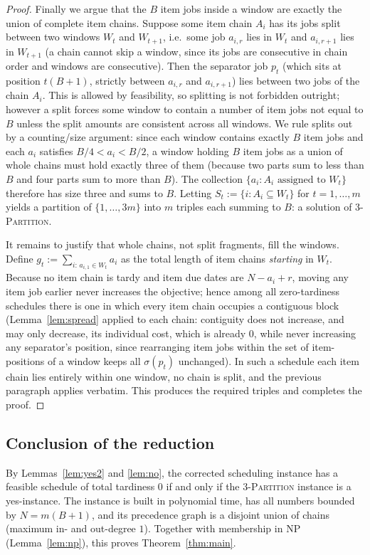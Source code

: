 \documentclass{amsart}
\theoremstyle{definition}
\theoremstyle{remark}
\begin{document}
\begin{proof}
Finally we argue that the $B$ item jobs inside a window are exactly the union of complete
item chains. Suppose some item chain $A_i$ has its jobs split between two windows
$W_t$ and $W_{t+1}$, i.e.\ some job $a_{i,r}$ lies in $W_t$ and $a_{i,r+1}$ lies in
$W_{t+1}$ (a chain cannot skip a window, since its jobs are consecutive in chain order and
windows are consecutive). Then the separator job $p_t$ (which sits at position $t(B+1)$,
strictly between $a_{i,r}$ and $a_{i,r+1}$) lies between two jobs of the chain $A_i$. This
is allowed by feasibility, so splitting is not forbidden outright; however a split forces
some window to contain a number of item jobs not equal to $B$ unless the split amounts are
consistent across all windows. We rule splits out by a counting/size argument: since each
window contains exactly $B$ item jobs and each $a_i$ satisfies $B/4<a_i<B/2$, a window
holding $B$ item jobs as a union of whole chains must hold exactly three of them
(because two parts sum to less than $B$ and four parts sum to more than $B$). The
collection $\{a_i : A_i \text{ assigned to } W_t\}$ therefore has size three and sums to
$B$. Letting $S_t:=\{i:A_i\subseteq W_t\}$ for $t=1,\dots,m$ yields a partition of
$\{1,\dots,3m\}$ into $m$ triples each summing to $B$: a solution of
\textsc{3-Partition}.

It remains to justify that whole chains, not split fragments, fill the windows. Define
$g_t:=\sum_{i:\,a_{i,1}\in W_t} a_i$ as the total length of item chains \emph{starting}
in $W_t$. Because no item chain is tardy and item due dates are $N-a_i+r$, moving any item
job earlier never increases the objective; hence among all zero-tardiness schedules there
is one in which every item chain occupies a contiguous block
(Lemma~\ref{lem:spread} applied to each chain: contiguity does not increase, and may only
decrease, its individual cost, which is already $0$, while never increasing any separator's
position, since rearranging item jobs within the set of item-positions of a window keeps
all $\sigma(p_t)$ unchanged). In such a schedule each item chain lies entirely within one
window, no chain is split, and the previous paragraph applies verbatim. This produces the
required triples and completes the proof.
\end{proof}

\subsection*{Conclusion of the reduction}

By Lemmas~\ref{lem:yes2} and \ref{lem:no}, the corrected scheduling instance has a
feasible schedule of total tardiness $0$ if and only if the \textsc{3-Partition}
instance is a yes-instance. The instance is built in polynomial time, has all numbers
bounded by $N=m(B+1)$, and its precedence graph is a disjoint union of chains
(maximum in- and out-degree $1$). Together with membership in NP (Lemma~\ref{lem:np}),
this proves Theorem~\ref{thm:main}.
\end{document}
